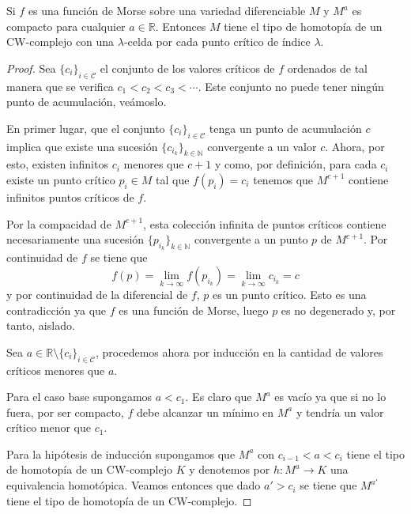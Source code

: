 \begin{theorem}\label{cwvariedad}
    Si $f$ es una función de Morse sobre una variedad diferenciable $M$ y $M^a$ es compacto para cualquier $a\in\mathbb{R}$. Entonces $M$ tiene el tipo de homotopía de un CW-complejo con una $\lambda$-celda por cada punto crítico de índice $\lambda$.
\end{theorem}
\begin{proof}
    Sea $\{c_i\}_{i\in \mathcal{C}}$ el conjunto de los valores críticos de $f$ ordenados de tal manera que se verifica $c_1<c_2<c_3<\cdots$. Este conjunto no puede tener ningún punto de acumulación, veámoslo.

    En primer lugar, que el conjunto $\{c_i\}_{i\in \mathcal{C}}$ tenga un punto de acumulación $c$ implica que existe una sucesión $\{c_{i_k}\}_{k\in \mathbb{N}}$ convergente a un valor $c$. Ahora, por esto, existen infinitos $c_i$ menores que $c+1$ y como, por definición, para cada $c_i$ existe un punto crítico $p_i\in M$ tal que $f(p_i) = c_i$ tenemos que $M^{c+1}$ contiene infinitos puntos críticos de $f$. 
    
    Por la compacidad de $M^{c+1}$, esta colección infinita de puntos críticos contiene necesariamente una sucesión $\{p_{i_k}\}_{k\in \mathbb{N}}$ convergente a un punto $p$ de $M^{c+1}$. Por continuidad de $f$ se tiene que 
    \begin{equation*}
        f(p) = \lim_{k\to \infty} f(p_{i_k}) =  \lim_{k\to \infty} c_{i_k} = c
    \end{equation*}
    y por continuidad de la diferencial de $f$, $p$ es un punto crítico. Esto es una contradicción ya que $f$ es una función de Morse, luego $p$ es no degenerado y, por tanto, aislado.

    \medskip

    Sea $a\in\mathbb{R}\setminus\{c_i\}_{i\in \mathcal{C}}$, procedemos ahora por inducción en la cantidad de valores críticos menores que $a$. 
    
    Para el caso base supongamos $a<c_1$. Es claro que $M^a$ es vacío ya que si no lo fuera, por ser compacto, $f$ debe alcanzar un mínimo en $M^a$ y tendría un valor crítico menor que $c_1$.

    Para la hipótesis de inducción supongamos que $M^a$ con $c_{i-1}<a<c_{i}$ tiene el tipo de homotopía de un CW-complejo $K$ y denotemos por $h:M^a\to K$ una equivalencia homotópica. Veamos entonces que dado $a'>c_{i}$ se tiene que $M^{a'}$ tiene el tipo de homotopía de un CW-complejo. 
    

\end{proof}
